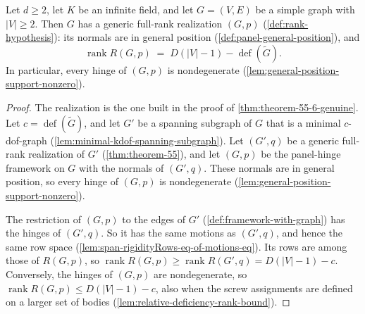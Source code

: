 \begin{theorem}
  \label{thm:theorem-55-6-rows}
  \leanok
  Let $d \ge 2$, let $K$ be an infinite field, and let $G = (V, E)$ be a
  simple graph with $|V| \ge 2$. Then $G$ has a generic full-rank
  realization $(G, p)$ (\cref{def:rank-hypothesis}): its normals are in
  general position (\cref{def:panel-general-position}), and
  \[
    \operatorname{rank} R(G,p) \;=\; D(|V| - 1) - \operatorname{def}(\tilde G).
  \]
  In particular, every hinge of $(G, p)$ is nondegenerate
  (\cref{lem:general-position-support-nonzero}).
\end{theorem}
\begin{proof}
  \leanok
  The realization is the one built in the proof of
  \cref{thm:theorem-55-6-genuine}. Let
  $c = \operatorname{def}(\tilde G)$, and let $G'$ be a spanning subgraph
  of $G$ that is a minimal $c$-dof-graph
  (\cref{lem:minimal-kdof-spanning-subgraph}). Let $(G', q)$ be a generic
  full-rank realization of $G'$ (\cref{thm:theorem-55}), and let $(G, p)$
  be the panel-hinge framework on $G$ with the normals of $(G', q)$. These
  normals are in general position, so every hinge of $(G, p)$ is
  nondegenerate (\cref{lem:general-position-support-nonzero}).

  The restriction of $(G, p)$ to the edges of $G'$
  (\cref{def:framework-with-graph}) has the hinges of $(G', q)$. So it
  has the same motions as $(G', q)$, and hence the same
  row space (\cref{lem:span-rigidityRows-eq-of-motions-eq}). Its rows are
  among those of $R(G, p)$, so
  $\operatorname{rank} R(G, p) \ge \operatorname{rank} R(G', q) =
  D(|V| - 1) - c$. Conversely, the hinges of $(G, p)$ are nondegenerate, so
  $\operatorname{rank} R(G, p) \le D(|V| - 1) - c$, also when the screw
  assignments are defined on a larger set of bodies
  (\cref{lem:relative-deficiency-rank-bound}).
\end{proof}

